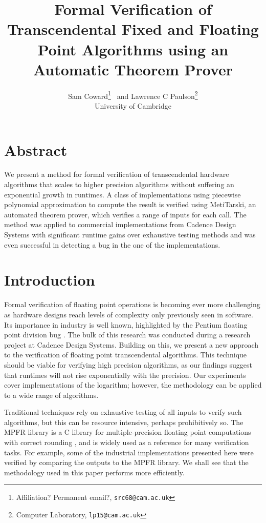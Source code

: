 \documentclass[a4]{article}
\begin{document}
\title{Formal Verification of Transcendental Fixed and Floating Point Algorithms using an Automatic Theorem Prover}
\author{Sam Coward\footnote{Affiliation? Permanent email?, \texttt{src68@cam.ac.uk}} \ and Lawrence C Paulson\footnote{Computer Laboratory, \texttt{lp15@cam.ac.uk}} \\
      University of Cambridge}
\maketitle

\normalsize
\section*{Abstract}
We present a method for formal verification of transcendental hardware algorithms that scales to higher precision algorithms without suffering an exponential growth in runtimes. A class of implementations using piecewise polynomial approximation to compute the result is verified using MetiTarski, an automated theorem prover, which verifies a range of inputs for each call. The method was applied to commercial implementations from Cadence Design Systems with significant runtime gains over exhaustive testing methods and was even successful in detecting a bug in the one of the implementations.  

\section{Introduction}

Formal verification of floating point operations is becoming ever more challenging as hardware designs reach levels of complexity only previously seen in software. Its importance in industry is well known, highlighted by the Pentium floating point division bug \cite{pratt1995anatomy}. The bulk of this research was conducted during a research project at Cadence Design Systems. Building on this, we present a new approach to the verification of floating point transcendental algorithms. This technique should be viable for verifying high precision algorithms, as our findings suggest that runtimes will not rise exponentially with the precision.  Our experiments cover implementations of the logarithm; however, the methodology can be applied to a wide range of algorithms. 

Traditional techniques rely on exhaustive testing of all inputs to verify such algorithms, but this can be resource intensive, perhaps prohibitively so. The MPFR library is a C library for multiple-precision floating point computations with correct rounding \cite{fousse2007mpfr}, and is widely used as a reference for many verification tasks. For example, some of the industrial implementations presented here were verified by comparing the outputs to the MPFR library. We shall see that the methodology used in this paper performs more efficiently. 
\end{document}
